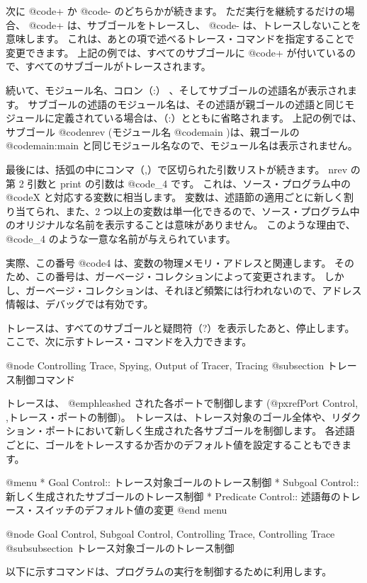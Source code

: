 {{{{次に @code{+} か @code{-} のどちらかが続きます。
ただ実行を継続するだけの場合、 @code{+} は、サブゴールをトレースし、 @code{-} は、トレースしないことを意味します。
これは、あとの項で述べるトレース・コマンドを指定することで変更できます。
上記の例では、すべてのサブゴールに @code{+} が付いているので、すべてのサブゴールがトレースされます。

続いて、モジュール名、コロン（:） 、そしてサブゴールの述語名が表示されます。
サブゴールの述語のモジュール名は、その述語が親ゴールの述語と同じモジュールに定義されている場合は、（:）とともに省略されます。
上記の例では、サブゴール @code{nrev} (モジュール名 @code{main} )は、親ゴールの @code{main:main} と同じモジュール名なので、モジュール名は表示されません。

最後には、括弧の中にコンマ（,）で区切られた引数リストが続きます。
 nrev の第 2 引数と print の引数は @code{_4} です。
これは、ソース・プログラム中の @code{X} と対応する変数に相当します。
変数は、述語節の適用ごとに新しく割り当てられ、また、2 つ以上の変数は単一化できるので、ソース・プログラム中のオリジナルな名前を表示することは意味がありません。
このような理由で、@code{_4} のような一意な名前が与えられています。

実際、この番号 @code{4} は、変数の物理メモリ・アドレスと関連します。
そのため、この番号は、ガーベージ・コレクションによって変更されます。
しかし、ガーベージ・コレクションは、それほど頻繁には行われないので、アドレス情報は、デバッグでは有効です。

トレースは、すべてのサブゴールと疑問符（?）を表示したあと、停止します。
ここで、次に示すトレース・コマンドを入力できます。

@node Controlling Trace, Spying, Output of Tracer, Tracing
@subsection トレース制御コマンド

トレースは、 @emph{leashed} された各ポートで制御します
(@pxref{Port Control, ,トレース・ポートの制御})。
トレースは、トレース対象のゴール全体や、リダクション・ポートにおいて新しく生成された各サブゴールを制御します。
各述語ごとに、ゴールをトレースするか否かのデフォルト値を設定することもできます。

@menu
* Goal Control::                トレース対象ゴールのトレース制御
* Subgoal Control::             新しく生成されたサブゴールのトレース制御
* Predicate Control::           述語毎のトレース・スイッチのデフォルト値の変更
@end menu

@node Goal Control, Subgoal Control, Controlling Trace, Controlling Trace
@subsubsection トレース対象ゴールのトレース制御

以下に示すコマンドは、プログラムの実行を制御するために利用します。

}}}}
